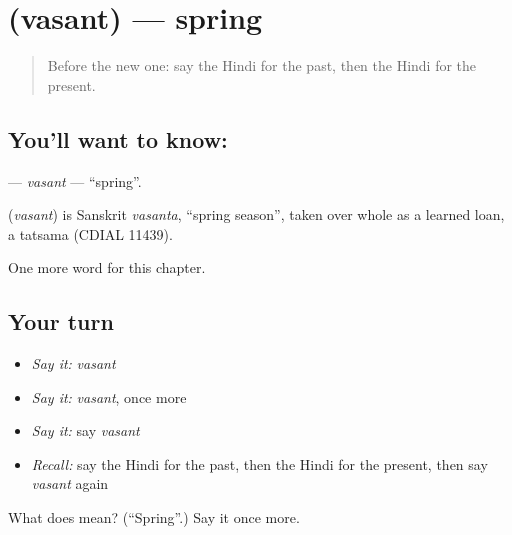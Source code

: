 \section[\texorpdfstring{\hi{वसंत} (vasant)}{वसंत (vasant)}]{ (vasant) — spring}

\label{lesson:HI-C221-vasant}



\begin{quote}
Before the new one: say the Hindi for the past, then the Hindi for the present.
\end{quote}

\subsection*{You'll want to know: }
\textbf{} — \emph{vasant} — \textquotedblleft{}spring\textquotedblright{}.

\begin{cousinweb}
\textbf{} (\emph{vasant}) is Sanskrit \emph{vasanta}, \textquotedblleft{}spring season\textquotedblright{}, taken over whole as a learned loan, a tatsama (CDIAL 11439).
\end{cousinweb}

\begin{grammarlens}[title={What you've built}]
One more word for this chapter.
\end{grammarlens}

\subsection*{Your turn}
\begin{itemize}
\raggedright
  \item \emph{Say it:} \emph{vasant}
  \item \emph{Say it:} \emph{vasant}, once more
  \item \emph{Say it:} say \emph{vasant}
  \item \emph{Recall:} say the Hindi for the past, then the Hindi for the present, then say \emph{vasant} again
\end{itemize}

\begin{tcolorbox}[breakable,colback=teal!4,colframe=teal!35!black,title={Before you move on}]
What does  mean? (\textquotedblleft{}Spring\textquotedblright{}.) Say it once more.
\end{tcolorbox}
